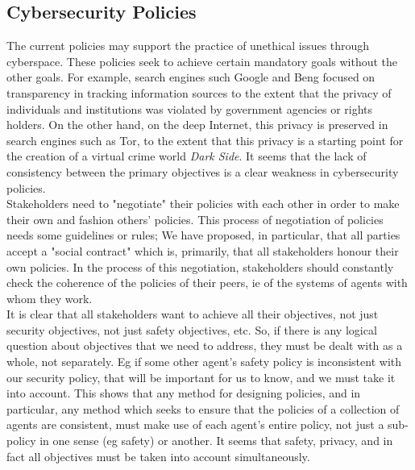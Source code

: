 \subsection{Cybersecurity Policies}
The current policies may support the practice 
of unethical issues through cyberspace.
 These policies seek to achieve certain mandatory goals without the other goals.
 For example,  search engines such Google and Beng focused on transparency in tracking information sources to the extent that the privacy of individuals and institutions was violated by government agencies or rights holders. On the other hand, on the deep Internet, this privacy is preserved in search engines such as Tor, to the extent that this privacy is a starting point for the creation of a virtual crime world \emph{Dark Side}. It seems that the lack of consistency between the primary objectives is a clear weakness in cybersecurity policies.
\\ Stakeholders need to "negotiate" their policies with each other in order to make their own and fashion others' policies. This process of negotiation of policies needs some guidelines or rules; We have proposed, in particular, that all parties accept a "social contract" which is, primarily, that all stakeholders honour their own policies. In the process of this negotiation, stakeholders should constantly check the coherence of the policies of their peers, ie of the systems of agents with whom they work.
\\ It is clear that all stakeholders want to achieve all their objectives, not just security objectives, not just safety objectives, etc. So, if there is any logical question about objectives that we need to address, they must be dealt with as a whole, not separately. Eg if some other agent's safety policy is inconsistent with our security policy, that will be important for us to know, and we must take it into account. This shows that any method for designing policies, and in particular, any method which seeks to ensure that the policies of a collection of agents are consistent, must make use of each agent's entire policy, not just a sub-policy in one sense (eg safety) or another. It seems that safety, privacy, and in fact all objectives must be taken into account simultaneously. 

